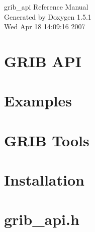 \documentclass[a4paper]{book}
\begin{document}
\begin{titlepage}
\vspace*{7cm}
\begin{center}
{\Large grib\_\-api Reference Manual}\\
\vspace*{1cm}
{\large Generated by Doxygen 1.5.1}\\
\vspace*{0.5cm}
{\small Wed Apr 18 14:09:16 2007}\\
\end{center}
\end{titlepage}
\clearemptydoublepage
{}
\tableofcontents
\clearemptydoublepage
{}
\chapter{GRIB API}
\label{index}\hypertarget{index}{}









\chapter{Examples}












\chapter{GRIB Tools}









\chapter{Installation}


\chapter{grib\_\-api.h}

\printindex
\end{document}
